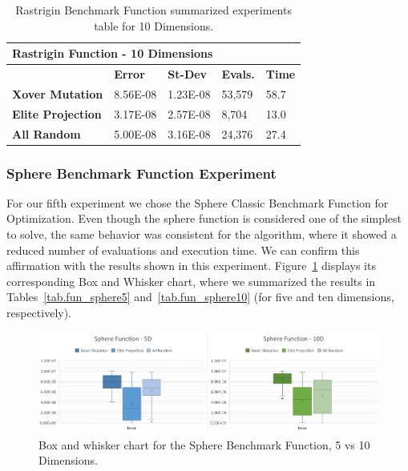 \documentclass[graybox]{svmult}
\begin{document}
            \begin{table}[]
                \scriptsize
                \centering
                \caption{Rastrigin Benchmark Function summarized experiments table for 10 Dimensions.}\label{tab.fun_rastrigin10}
                \begin{tabular}{@{}lllll@{}}
                \toprule
                \multicolumn{5}{l}{\textbf{Rastrigin Function - 10   Dimensions}} \\ \midrule
                & \textbf{Error} & \textbf{St-Dev} & \textbf{Evals.} & \textbf{Time} \\
                \textbf{Xover Mutation} & 8.56E-08 & 1.23E-08 & 53,579 & 58.7 \\
                \textbf{Elite Projection} & 3.17E-08 & 2.57E-08 & 8,704 & 13.0 \\
                \textbf{All Random} & 5.00E-08 & 3.16E-08 & 24,376 & 27.4 \\ \bottomrule
                \end{tabular}
                \end{table}
            
            \FloatBarrier


        \subsubsection{Sphere Benchmark Function Experiment}

            For our fifth experiment we chose the Sphere Classic Benchmark
            Function for Optimization. Even though the sphere function is
            considered one of the simplest to solve, the same behavior was
            consistent for the algorithm, where it showed a reduced number of
            evaluations and execution time. We can confirm this affirmation
            with the results shown in this experiment.
            Figure~\ref{fig.fun_sphere} displays its corresponding Box and
            Whisker chart, where we summarized the results in
            Tables~\ref{tab.fun_sphere5} and~\ref{tab.fun_sphere10} (for
            five and ten dimensions, respectively).

            \begin{figure}
                \includegraphics[width=0.99\linewidth, frame]{img/fig_fun_sphere.pdf}
                \caption{Box and whisker chart for the Sphere Benchmark Function, 5 vs 10 Dimensions.} \label{fig.fun_sphere}
                \end{figure}
\end{document}
